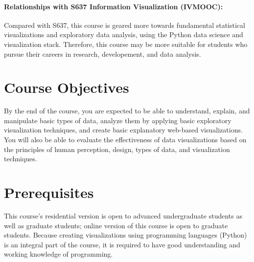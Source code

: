 \documentclass[11pt,article,oneside]{memoir} %
\begin{document}
\paragraph{Relationships with S637 Information Visualization (IVMOOC):}
Compared with S637, this course is geared more towards fundamental statistical
visualizations and exploratory data analysis, using the Python data science and
visualization stack.  Therefore, this course may be more suitable for students who
pursue their careers in research, developement, and data analysis. 

\section{Course Objectives}%

By the end of the course, you are expected to be able to understand, explain,
and manipulate basic types of data, analyze them by applying basic exploratory
visualization techniques, and create basic explanatory web-based
visualizations. You will also be able to evaluate the effectiveness of data
visualizations based on the principles of human perception, design, types of
data, and visualization techniques. 
 


\section{Prerequisites}%
\label{sec:Prerequisites}

This course's residential version is open to advanced undergraduate students as
well as graduate students; online version of this course is open to graduate
students. Because creating visualizations using programming languages (Python)
is an integral part of the course, it is required to have good understanding
and working knowledge of programming. 
\end{document}

